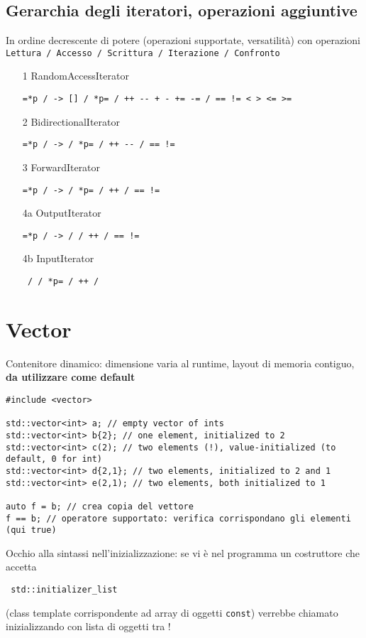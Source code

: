 \documentclass[10pt, oneside]{Book}
\begin{document}
\subsection{Gerarchia degli iteratori, operazioni aggiuntive}
In ordine decrescente di potere (operazioni supportate, versatilità) con operazioni \texttt{Lettura / Accesso / Scrittura / Iterazione / Confronto}
\begin{enumerate}
\item[1] RandomAccessIterator
\begin{verbatim}
=*p / -> [] / *p= / ++ -- + - += -= / == != < > <= >=
\end{verbatim}
\item[2] BidirectionalIterator
\begin{verbatim}
=*p / -> / *p= / ++ -- / == !=
\end{verbatim}
\item[3] ForwardIterator
\begin{verbatim}
=*p / -> / *p= / ++ / == !=
\end{verbatim}
\item[4a] OutputIterator
\begin{verbatim}
=*p / -> / / ++ / == !=
\end{verbatim}
\item[4b] InputIterator
\begin{verbatim}
 / / *p= / ++ /
\end{verbatim}
\end{enumerate}


\section{Vector}
Contenitore dinamico: dimensione varia al runtime, layout di memoria contiguo, \textbf{da utilizzare come default}
\begin{verbatim}
#include <vector>

std::vector<int> a; // empty vector of ints
std::vector<int> b{2}; // one element, initialized to 2
std::vector<int> c(2); // two elements (!), value-initialized (to default, 0 for int)
std::vector<int> d{2,1}; // two elements, initialized to 2 and 1
std::vector<int> e(2,1); // two elements, both initialized to 1

auto f = b; // crea copia del vettore
f == b; // operatore supportato: verifica corrispondano gli elementi (qui true)
\end{verbatim}
Occhio alla sintassi nell'inizializzazione: se vi è nel programma un costruttore che accetta \begin{verbatim} std::initializer_list
\end{verbatim} (class template corrispondente ad array di oggetti \texttt{const}) verrebbe chiamato inizializzando con lista di oggetti tra \texttt{} !
\end{document}
